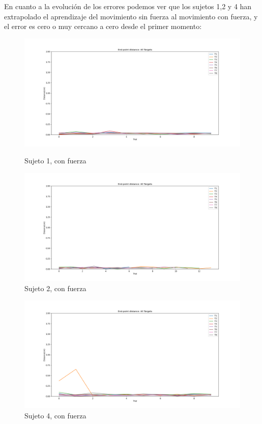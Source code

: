 \documentclass[a4paper,11pt, oneside]{book}
\begin{document}
En cuanto a la evolución de los errores podemos ver que los sujetos 1,2 y 4 han extrapolado el aprendizaje del movimiento sin fuerza al movimiento con fuerza, y el error es cero o muy cercano a cero desde el primer momento:
\begin{figure}[H]
	\begin{minipage}[b]{0.5\linewidth}
		\centering
		\includegraphics[width=\linewidth]{sujeto1/force/evolution_distance}
		\caption{Sujeto 1, con fuerza}
		\label{fig:figura1}
	\end{minipage}
	\hspace{0.5cm}
	\begin{minipage}[b]{0.5\linewidth}
		\centering
		\includegraphics[width=\linewidth]{sujeto2/force/evolution_distance}
		\caption{Sujeto 2, con fuerza}
		\label{fig:figura2}
	\end{minipage}
\end{figure}
\begin{figure}[h!]
	\begin{minipage}[b]{0.5\linewidth}
		\centering
		\includegraphics[width=\linewidth]{sujeto4/force/evolution_distance}
		\caption{Sujeto 4, con fuerza}
		\label{fig:figura1}
	\end{minipage}
\end{figure}
\end{document}
